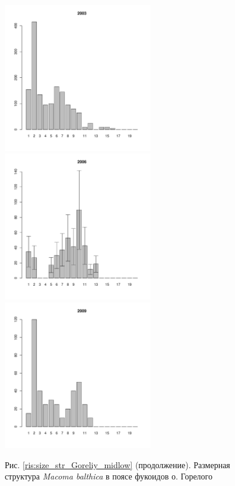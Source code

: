 \documentclass[12pt, a4paper]{article}
\begin{document}
\begin{figure}[h]
\begin{multicols}{3}
\hfill
\includegraphics[width=65mm]{../White_Sea/Luvenga_Goreliy/midlow_2003_.pdf}
\hfill
\includegraphics[width=65mm]{../White_Sea/Luvenga_Goreliy/midlow_2006_.pdf}
\hfill
\includegraphics[width=65mm]{../White_Sea/Luvenga_Goreliy/midlow_2009_.pdf}
\end{multicols}



\begin{center}
Рис. \ref{ris:size_str_Goreliy_midlow} (продолжение). Размерная структура {\it Macoma balthica} в поясе фукоидов о. Горелого

\end{center}
\end{figure}
\end{document}
